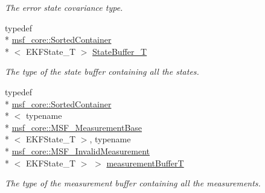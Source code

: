 \begin{DoxyCompactItemize}
\begin{DoxyCompactList}\small\item\em The error state covariance type. \end{DoxyCompactList}\item 
\hypertarget{classmsf__core_1_1MSF__Core_a71db0f8ef9e865ef4d85b7365f01388d}{typedef \\*
\hyperlink{classmsf__core_1_1SortedContainer}{msf\-\_\-core\-::\-Sorted\-Container}\\*
$<$ E\-K\-F\-State\-\_\-\-T $>$ \hyperlink{classmsf__core_1_1MSF__Core_a71db0f8ef9e865ef4d85b7365f01388d}{State\-Buffer\-\_\-\-T}}\label{classmsf__core_1_1MSF__Core_a71db0f8ef9e865ef4d85b7365f01388d}

\begin{DoxyCompactList}\small\item\em The type of the state buffer containing all the states. \end{DoxyCompactList}\item 
\hypertarget{classmsf__core_1_1MSF__Core_abbdace8623ce8be7c430f6f7dad6b6fa}{typedef \\*
\hyperlink{classmsf__core_1_1SortedContainer}{msf\-\_\-core\-::\-Sorted\-Container}\\*
$<$ typename \\*
\hyperlink{classmsf__core_1_1MSF__MeasurementBase}{msf\-\_\-core\-::\-M\-S\-F\-\_\-\-Measurement\-Base}\\*
$<$ E\-K\-F\-State\-\_\-\-T $>$, typename \\*
\hyperlink{classmsf__core_1_1MSF__InvalidMeasurement}{msf\-\_\-core\-::\-M\-S\-F\-\_\-\-Invalid\-Measurement}\\*
$<$ E\-K\-F\-State\-\_\-\-T $>$ $>$ \hyperlink{classmsf__core_1_1MSF__Core_abbdace8623ce8be7c430f6f7dad6b6fa}{measurement\-Buffer\-T}}\label{classmsf__core_1_1MSF__Core_abbdace8623ce8be7c430f6f7dad6b6fa}

\begin{DoxyCompactList}\small\item\em The type of the measurement buffer containing all the measurements. \end{DoxyCompactList}\end{DoxyCompactItemize}
